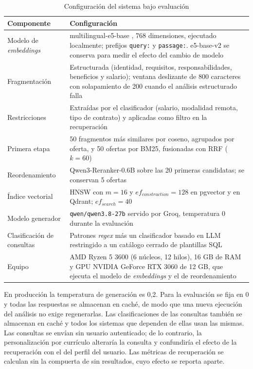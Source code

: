 \begin{table}[htbp!]
    \centering
    \caption{Configuración del sistema bajo evaluación}
    \label{tab:met-config}
    \begin{tabular}{|p{5cm}|p{9.2cm}|}
        \hline
        \textbf{Componente} & \textbf{Configuración} \\
        \hline
        Modelo de \textit{embeddings} & multilingual-e5-base \citep{Wang2024mE5}, 768 dimensiones, ejecutado localmente; prefijos \texttt{query:} y \texttt{passage:}. e5-base-v2 \citep{Wang2022E5} se conserva para medir el efecto del cambio de modelo \\
        \hline
        Fragmentación & Estructurada (identidad, requisitos, responsabilidades, beneficios y salario); ventana deslizante de 800 caracteres con solapamiento de 200 cuando el análisis estructurado falla \\
        \hline
        Restricciones & Extraídas por el clasificador (salario, modalidad remota, tipo de contrato) y aplicadas como filtro en la recuperación \\
        \hline
        Primera etapa & 50 fragmentos más similares por coseno, agrupados por oferta, y 50 ofertas por BM25, fusionadas con RRF ($k = 60$) \\
        \hline
        Reordenamiento & Qwen3-Reranker-0.6B \citep{Zhang2025Qwen3} sobre las 20 primeras candidatas; se conservan 5 ofertas \\
        \hline
        Índice vectorial & HNSW con $m=16$ y $ef_{construction}=128$ en pgvector y en Qdrant; $ef_{search}=40$ \\
        \hline
        Modelo generador & \texttt{qwen/qwen3.8-27b} servido por Groq, temperatura 0 durante la evaluación \\
        \hline
        Clasificación de consultas & Patrones \textit{regex} más un clasificador basado en LLM restringido a un catálogo cerrado de plantillas SQL \\
        \hline
        Equipo & AMD Ryzen 5 3600 (6 núcleos, 12 hilos), 16 GB de RAM y GPU NVIDIA GeForce RTX 3060 de 12 GB, que ejecuta el modelo de \textit{embeddings} y el de reordenamiento \\
        \hline
    \end{tabular}
\end{table}

En producción la temperatura de generación es 0,2. Para la evaluación se fija en 0 y todas las respuestas se almacenan en caché, de modo que una nueva ejecución del análisis no exige regenerarlas. Las clasificaciones de las consultas también se almacenan en caché y todos los sistemas que dependen de ellas usan las mismas. Las consultas se envían sin usuario autenticado; de lo contrario, la personalización por currículo alteraría la consulta y confundiría el efecto de la recuperación con el del perfil del usuario. Las métricas de recuperación se calculan sin la compuerta de sin resultados, cuyo efecto se reporta aparte.

